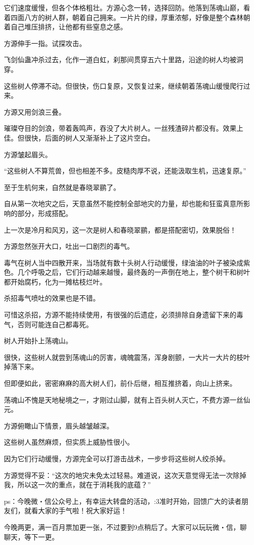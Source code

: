 \begin{this_body}
它们速度缓慢，但各个体格粗壮。方源心念一转，选择回防。他落到荡魂山巅，看着四面八方的树人群，朝着自己拥来。一片片的绿，厚重浓郁，好像是整个森林朝着自己堆压排挤，让他都有些窒息之感。

方源伸手一指。试探攻击。

飞剑仙蛊冲杀过去，化作一道白虹，刹那间贯穿五六十里路，沿途的树人均被洞穿。

这些树人停滞不动。但很快，伤口复原，又恢复过来，继续朝着荡魂山缓慢爬行过来。

方源又用剑浪三叠。

璀璨夺目的剑浪，带着轰鸣声，吞没了大片树人。一丝残渣碎片都没有。效果上佳。但很快，后面的树人又渐渐补上了这片空白。

方源皱起眉头。

“这些树人不算荒兽，但也相差不多。皮糙肉厚不说，还能汲取生机，迅速复原。”

至于生机何来，自然就是春晓翠鹂了。

自从第一次地灾之后，天意虽然不能控制全部地灾的力量，却也能和狂蛮真意所影响的部分，形成搭配。

上一次是冷月和风刃，这一次是树人和春晓翠鹂，都是搭配密切，效果脱俗！

方源忽然张开大口，吐出一口剧烈的毒气。

毒气在树人当中四散开来，当场就有数十头树人行动缓慢，绿油油的叶子被染成紫色。几个呼吸之后，它们行动越来越慢，最终轰的一声倒在地上，整个树干和树叶都开始腐朽，化为一摊枯枝烂叶。

杀招毒气喷吐的效果也是不错。

可惜这杀招，方源不能持续使用，有很强的后遗症，必须排除自身遗留下来的毒气，否则可能连自己都毒死。

树人开始扑上荡魂山。

很快，这些树人就尝到荡魂山的厉害，魂魄震荡，浑身剧颤，一大片一大片的枝叶掉落下来。

但即便如此，密密麻麻的高大树人们，前仆后继，相互推挤着，向山上挤来。

荡魂山不愧是天地秘境之一，才刚过山脚，就有上百头树人灭亡，不费方源一丝仙元。

方源俯瞰山下情景，眉头越皱越深。

这些树人虽然麻烦，但实质上威胁性很小。

因为它们行动缓慢，方源完全可以打游击战术，一步步将这些树人绞杀掉。

方源觉得不妥：“这次的地灾未免太过轻易。难道说，这次天意觉得无法一次除掉我，所以这一次的重点，就在于消耗我的底蕴？”

ps：今晚微・信公众号上，有幸运大转盘的活动，:3准时开始，回馈广大的读者朋友们，就看大家的手气啦！祝大家好运！

今晚两更，满一百月票加更一张，不过要到9点稍后了。大家可以玩玩微・信，聊聊天，等下一更。

\end{this_body}

